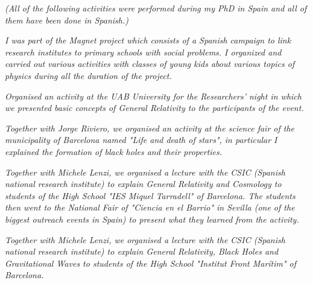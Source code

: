 \textit{(All of the following activities were performed during my PhD in Spain and all of them have been done in Spanish.)}
\resumeSubHeadingListStart
{}
\begin{indentedtext}
\textit{\large I was part of the Magnet project which consists of a Spanish campaign to link research institutes to primary schools with social problems. I organized and carried out various activities with classes of young kids about various topics of physics during all the duration of the project.}
\end{indentedtext}
\resumeSubHeadingListEnd

\resumeSubHeadingListStart
{}
\begin{indentedtext}
\textit{\large Organised an activity at the UAB University for the Researchers' night in which we presented basic concepts of General Relativity to the participants of the event.}
\end{indentedtext}
\resumeSubHeadingListEnd

\resumeSubHeadingListStart
{}
\begin{indentedtext}
\textit{\large Together with Jorge Riviero, we organised an activity at the science fair of the municipality of Barcelona named \textit{"Life and death of stars"}, in particular I explained the formation of black holes and their properties.}
\end{indentedtext}
\resumeSubHeadingListEnd

\resumeSubHeadingListStart
{}
\begin{indentedtext}
\textit{\large Together with Michele Lenzi, we organised a lecture with the CSIC (Spanish national research institute) to explain General Relativity and Cosmology to students of the High School "IES Miquel Tarradell" of Barcelona. The students then went to the National Fair of "Ciencia en el Barrio" in Sevilla (one of the biggest outreach events in Spain) to present what they learned from the activity.}
\end{indentedtext}
\resumeSubHeadingListEnd

\resumeSubHeadingListStart
{}
\begin{indentedtext}
\textit{\large Together with Michele Lenzi, we organised a lecture with the CSIC (Spanish national research institute) to explain General Relativity, Black Holes and Gravitational Waves to students of the High School "Institut Front Marítim" of Barcelona.}
\end{indentedtext}
\resumeSubHeadingListEnd

